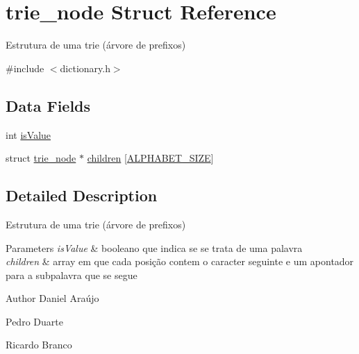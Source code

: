 \hypertarget{structtrie__node}{\section{trie\+\_\+node Struct Reference}
\label{structtrie__node}
}


Estrutura de uma trie (árvore de prefixos)  




{\ttfamily \#include $<$dictionary.\+h$>$}

\subsection*{Data Fields}
\begin{DoxyCompactItemize}
\item 
int \hyperlink{structtrie__node_a581570ae1f0b19ebd92d9050d0db9308}{is\+Value}
\item 
struct \hyperlink{structtrie__node}{trie\+\_\+node} $\ast$ \hyperlink{structtrie__node_aaffe5ae4ce6f851acc2d1d620720a31d}{children} \mbox{[}\hyperlink{dictionary_8h_a6572f1706059832f94025fa12c6c45ed}{A\+L\+P\+H\+A\+B\+E\+T\+\_\+\+S\+I\+Z\+E}\mbox{]}
\end{DoxyCompactItemize}


\subsection{Detailed Description}
Estrutura de uma trie (árvore de prefixos) 


\begin{DoxyParams}{Parameters}
{\em is\+Value} & booleano que indica se se trata de uma palavra \\
\hline
{\em children} & array em que cada posição contem o caracter seguinte e um apontador para a subpalavra que se segue \\
\hline
\end{DoxyParams}
\begin{DoxyAuthor}{Author}
Daniel Araújo 

Pedro Duarte 

Ricardo Branco 
\end{DoxyAuthor}


